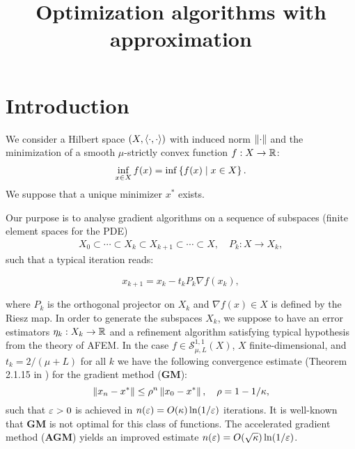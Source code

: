 \documentclass[12pt,english]{article}
\begin{document}

\title{Optimization algorithms with approximation}
\author{}
\maketitle
\tableofcontents

%
\section{Introduction}\label{sec:}
%
%
We consider a Hilbert space $(X,\langle\cdot,\cdot\rangle)$ with induced norm $\left\|\cdot\right\|$ and the minimization of a smooth $\mu$-strictly convex function $f:X\to\mathbb R$:
%
\begin{align*}
\inf_{x\in X} f(x) = \inf\left\{f(x)\;\middle|\;x\in X\right\}.
\end{align*}
%
We suppose that a unique minimizer $x^*$ exists.
%

Our purpose is to analyse gradient algorithms on a sequence of subspaces (finite element spaces for the PDE)
%
\begin{align*}
X_0 \subset \cdots \subset X_k \subset X_{k+1}\subset \cdots \subset X,\quad P_k: X\to X_k,
\end{align*}
%
such that a typical iteration reads: 
%
\begin{yellow}
\begin{equation}\label{eq:pgm}
x_{k+1} = x_k - t_k P_{k}\nabla f(x_k),
\end{equation}
\end{yellow}
%
where $P_k$ is the orthogonal projector on $X_k$ and $\nabla f(x)\in X$ is defined by the Riesz map. In order to generate the subspaces $X_k$, we suppose to have 
an error estimators $\eta_k:X_k\to\mathbb R$ and a refinement algorithm satisfying typical hypothesis from the theory of AFEM.
% 
In the case $f\in \mathcal S^{1,1}_{\mu,L}(X)$, $X$ finite-dimensional, and $t_k=2/(\mu+L)$ for all $k$ we have the following {convergence estimate}  (Theorem 2.1.15 in \cite{Nesterov18}) for the gradient method (\textbf{GM}):
%
\begin{equation}\label{eq:gmlipsmoothest}
\left\|x_n-x^*\right\| \le \rho^n\left\|x_0-x^*\right\|,\quad \rho = 1-1/\kappa,
\end{equation}
%
such that $\varepsilon>0$ is achieved in $n(\varepsilon) = O(\kappa)\ln(1/\varepsilon)$ iterations.
It is well-known that \textbf{GM} is not optimal for this class of functions. The accelerated gradient method (\textbf{AGM}) \cite{Nesterov18} yields an improved estimate  $n(\varepsilon) = O(\sqrt{\kappa})\ln(1/\varepsilon)$.
\end{document}
